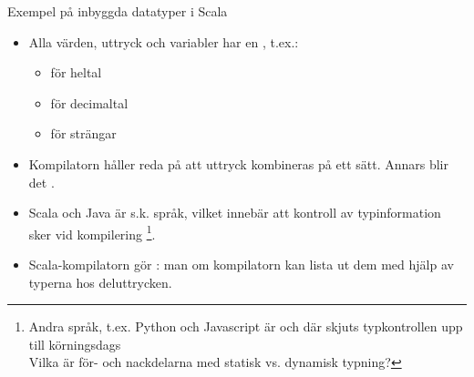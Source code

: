 \begin{Slide}{Exempel på inbyggda datatyper i Scala}\SlideFontSmall
\begin{itemize}
\item Alla värden, uttryck och variabler har en \href{https://sv.wikipedia.org/wiki/Datatyp}{}, t.ex.:
\begin{itemize}\SlideFontTiny
\item {} för heltal
\item {} för decimaltal
\item {} för strängar
\end{itemize}

\item Kompilatorn håller reda på att uttryck kombineras på ett  sätt. Annars blir det .

\item Scala och Java är s.k. \href{https://sv.wikipedia.org/wiki/Typsystem}{} språk, vilket innebär att kontroll av typinformation sker vid kompilering \footnote{Andra språk, t.ex. Python och Javascript är  och där skjuts typkontrollen upp till körningsdags  \\ Vilka är för- och nackdelarna med statisk vs. dynamisk typning?}.

\item Scala-kompilatorn gör \href{https://en.wikipedia.org/wiki/Type_inference}{}: man  om kompilatorn kan lista ut dem med hjälp av typerna hos deluttrycken.

\end{itemize}
\end{Slide}


